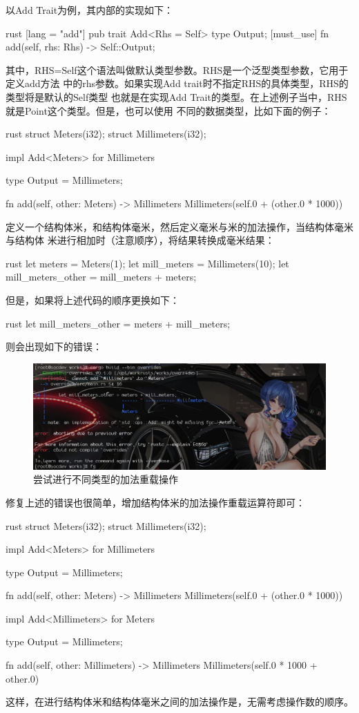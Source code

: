 以Add Trait为例，其内部的实现如下：
\begin{code-block}{rust}
[lang = "add"]
pub trait Add<Rhs = Self> {
    type Output;
    [must_use]
    fn add(self, rhs: Rhs) -> Self::Output;
}
\end{code-block}
其中，RHS=Self这个语法叫做默认类型参数。RHS是一个泛型类型参数，它用于定义add方法
中的rhs参数。如果实现Add trait时不指定RHS的具体类型，RHS的类型将是默认的Self类型
也就是在实现Add Trait的类型。在上述例子当中，RHS就是Point这个类型。但是，也可以使用
不同的数据类型，比如下面的例子：
\begin{code-block}{rust}
struct Meters(i32);
struct Millimeters(i32);

impl Add<Meters> for Millimeters {
    type Output = Millimeters;

    fn add(self, other: Meters) -> Millimeters {
        Millimeters(self.0 + (other.0 * 1000))
    }
}
\end{code-block}
定义一个结构体米，和结构体毫米，然后定义毫米与米的加法操作，当结构体毫米与结构体
米进行相加时（注意顺序），将结果转换成毫米结果：
\begin{code-block}{rust}
let meters = Meters(1);
let mill_meters = Millimeters(10);
let mill_meters_other = mill_meters + meters;
\end{code-block}
但是，如果将上述代码的顺序更换如下：
\begin{code-block}{rust}
let mill_meters_other = meters + mill_meters;
\end{code-block}
则会出现如下的错误：
\begin{figure}[H]
  \centering
  \includegraphics[width=\linewidth]{rust_override_error.png}
  \caption{尝试进行不同类型的加法重载操作}
  \label{fig:rust_override_error}
\end{figure}
修复上述的错误也很简单，增加结构体米的加法操作重载运算符即可：
\begin{code-block}{rust}
struct Meters(i32);
struct Millimeters(i32);

impl Add<Meters> for Millimeters {
    type Output = Millimeters;

    fn add(self, other: Meters) -> Millimeters {
        Millimeters(self.0 + (other.0 * 1000))
    }
}

impl Add<Millimeters> for Meters {
    type Output = Millimeters;

    fn add(self, other: Millimeters) -> Millimeters {
        Millimeters(self.0 * 1000 + other.0)
    }
}
\end{code-block}
这样，在进行结构体米和结构体毫米之间的加法操作是，无需考虑操作数的顺序。
